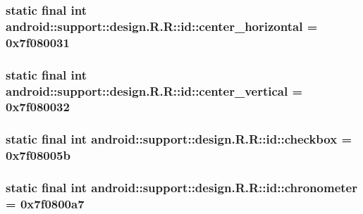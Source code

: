 \hypertarget{classandroid_1_1support_1_1design_1_1_r_1_1id_30a2fc90aec329051da46abb7941b59c}{
\subsubsection[{center\_\-horizontal}]{\setlength{\rightskip}{0pt plus 5cm}static final int android::support::design.R.R::id::center\_\-horizontal = 0x7f080031}}
\label{classandroid_1_1support_1_1design_1_1_r_1_1id_30a2fc90aec329051da46abb7941b59c}


\hypertarget{classandroid_1_1support_1_1design_1_1_r_1_1id_b4ef8fa4e3e0cae30c58c1ec6c625bfd}{
\subsubsection[{center\_\-vertical}]{\setlength{\rightskip}{0pt plus 5cm}static final int android::support::design.R.R::id::center\_\-vertical = 0x7f080032}}
\label{classandroid_1_1support_1_1design_1_1_r_1_1id_b4ef8fa4e3e0cae30c58c1ec6c625bfd}


\hypertarget{classandroid_1_1support_1_1design_1_1_r_1_1id_0ce1300f7240b897a05b092da2fc12af}{
\subsubsection[{checkbox}]{\setlength{\rightskip}{0pt plus 5cm}static final int android::support::design.R.R::id::checkbox = 0x7f08005b}}
\label{classandroid_1_1support_1_1design_1_1_r_1_1id_0ce1300f7240b897a05b092da2fc12af}


\hypertarget{classandroid_1_1support_1_1design_1_1_r_1_1id_a42d884d919d1d51b13ab02693cea6ca}{
\subsubsection[{chronometer}]{\setlength{\rightskip}{0pt plus 5cm}static final int android::support::design.R.R::id::chronometer = 0x7f0800a7}}
\label{classandroid_1_1support_1_1design_1_1_r_1_1id_a42d884d919d1d51b13ab02693cea6ca}


